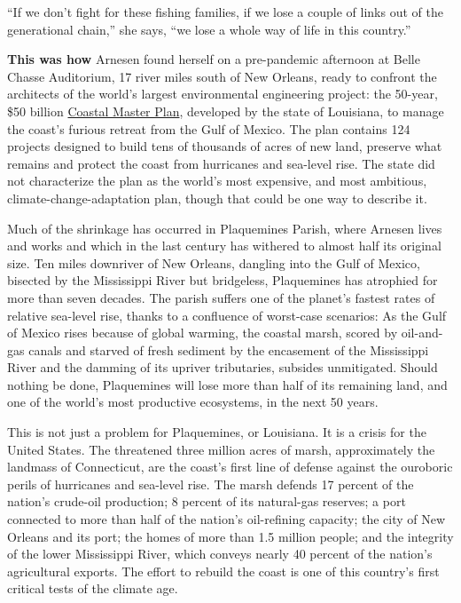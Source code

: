 ``If we don't fight for these fishing families, if we lose a couple of
links out of the generational chain,'' she says, ``we lose a whole way
of life in this country.''

\textbf{This was how} Arnesen found herself on a pre-pandemic afternoon
at Belle Chasse Auditorium, 17 river miles south of New Orleans, ready
to confront the architects of the world's largest environmental
engineering project: the 50-year, \$50 billion
\href{http://coastal.la.gov/our-plan/2017-coastal-master-plan/}{Coastal
Master Plan}, developed by the state of Louisiana, to manage the coast's
furious retreat from the Gulf of Mexico. The plan contains 124 projects
designed to build tens of thousands of acres of new land, preserve what
remains and protect the coast from hurricanes and sea-level rise. The
state did not characterize the plan as the world's most expensive, and
most ambitious, climate-change-adaptation plan, though that could be one
way to describe it.

Much of the shrinkage has occurred in Plaquemines Parish, where Arnesen
lives and works and which in the last century has withered to almost
half its original size. Ten miles downriver of New Orleans, dangling
into the Gulf of Mexico, bisected by the Mississippi River but
bridgeless, Plaquemines has atrophied for more than seven decades. The
parish suffers one of the planet's fastest rates of relative sea-level
rise, thanks to a confluence of worst-case scenarios: As the Gulf of
Mexico rises because of global warming, the coastal marsh, scored by
oil-and-gas canals and starved of fresh sediment by the encasement of
the Mississippi River and the damming of its upriver tributaries,
subsides unmitigated. Should nothing be done, Plaquemines will lose more
than half of its remaining land, and one of the world's most productive
ecosystems, in the next 50 years.

This is not just a problem for Plaquemines, or Louisiana. It is a crisis
for the United States. The threatened three million acres of marsh,
approximately the landmass of Connecticut, are the coast's first line of
defense against the ouroboric perils of hurricanes and sea-level rise.
The marsh defends 17 percent of the nation's crude-oil production; 8
percent of its natural-gas reserves; a port connected to more than half
of the nation's oil-refining capacity; the city of New Orleans and its
port; the homes of more than 1.5 million people; and the integrity of
the lower Mississippi River, which conveys nearly 40 percent of the
nation's agricultural exports. The effort to rebuild the coast is one of
this country's first critical tests of the climate age.

